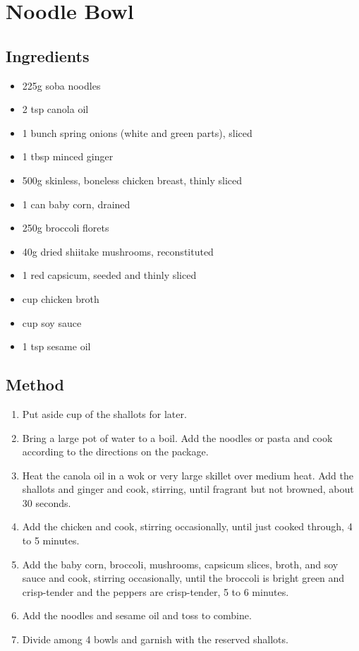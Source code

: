 \section{Noodle Bowl}


\subsection{Ingredients}

\begin{itemize}
	\item 225g soba noodles
	\item 2 tsp canola oil
	\item 1 bunch spring onions (white and green parts), sliced
	\item 1 tbsp minced ginger
	\item 500g skinless, boneless chicken breast, thinly sliced
	\item 1 can baby corn, drained
	\item 250g broccoli florets
	\item 40g dried shiitake mushrooms, reconstituted
	\item 1 red capsicum, seeded and thinly sliced
	\item {} cup chicken broth
	\item {} cup soy sauce
	\item 1 tsp sesame oil
\end{itemize}

\subsection{Method}

\begin{enumerate}
	\item Put aside  cup of the shallots for later.
	\item Bring a large pot of water to a boil. Add the noodles or pasta and cook according to the directions on the package.
	\item Heat the canola oil in a wok or very large skillet over medium heat. Add the shallots and ginger and cook, stirring, until fragrant but not browned, about 30 seconds.
	\item Add the chicken and cook, stirring occasionally, until just cooked through, 4 to 5 minutes.
	\item Add the baby corn, broccoli, mushrooms, capsicum slices, broth, and soy sauce and cook, stirring occasionally, until the broccoli is bright green and crisp-tender and the peppers are crisp-tender, 5 to 6 minutes.
	\item Add the noodles and sesame oil and toss to combine.
	\item Divide among 4 bowls and garnish with the reserved shallots.
\end{enumerate}
